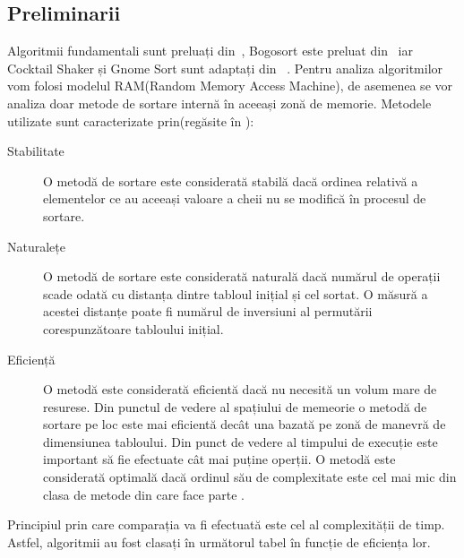 \documentclass[12pt]{article}
\begin{document}
\subsection{Preliminarii}
\label{sub:prel}


Algoritmii fundamentali sunt preluați din~\cite{ZAHARIE2008}, Bogosort este preluat din~\cite{BOGO2013} iar Cocktail Shaker și Gnome Sort sunt adaptați din ~\cite{COMP2015}.
Pentru analiza algoritmilor vom folosi modelul RAM(Random Memory Access Machine), de asemenea se vor analiza doar metode de sortare internă în aceeași zonă de memorie. Metodele utilizate sunt caracterizate prin(regăsite în \cite{ZAHARIE2008}):
\begin{description}
\item [Stabilitate ] O metodă de sortare este considerată stabilă dacă ordinea relativă a elementelor ce au aceeași valoare a cheii nu se modifică în procesul de sortare.
\item[Naturalețe ] O metodă de sortare este considerată naturală dacă numărul de operații scade odată cu distanța dintre tabloul inițial și cel sortat. O măsură a acestei distanțe poate fi numărul de inversiuni al permutării corespunzătoare tabloului inițial.
\item[Eficiență ] O metodă este considerată eficientă dacă nu necesită un volum mare de resurese. Din punctul de vedere al spațiului de memeorie o metodă de sortare pe loc este mai eficientă decât una bazată pe zonă de manevră de dimensiunea tabloului. Din punct de vedere al timpului de execuție este important să fie efectuate cât mai puține operții. O metodă este considerată optimală dacă ordinul său de complexitate este cel mai mic din clasa de metode din care face parte .
\end{description}
Principiul prin care comparația va fi efectuată este cel al complexității de timp. Astfel, algoritmii au fost clasați în următorul tabel în funcție de eficiența lor.
\end{document}
